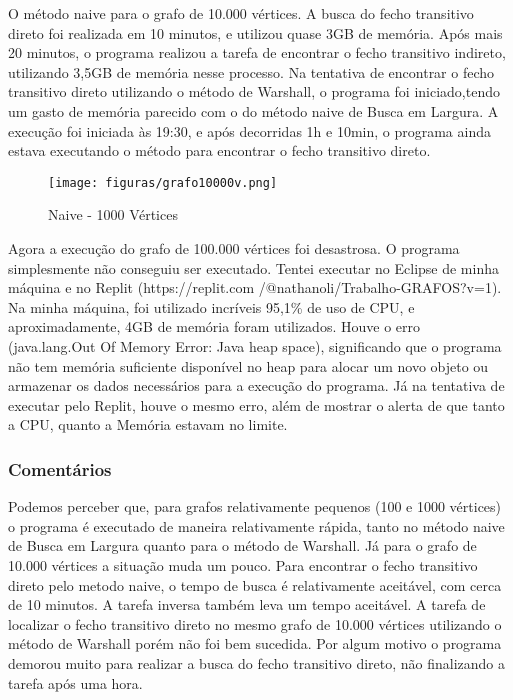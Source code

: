 \vspace{\baselineskip}

O método naive para o grafo de 10.000 vértices. A busca do fecho transitivo direto foi realizada em 10 minutos, e utilizou quase 3GB de memória. Após mais 20 minutos, o programa realizou a tarefa de encontrar o fecho transitivo indireto, utilizando 3,5GB de memória nesse processo. Na tentativa de encontrar o fecho transitivo direto utilizando o método de Warshall, o programa foi iniciado,tendo um gasto de memória parecido com o do método naive de Busca em Largura. A execução foi iniciada às 19:30, e após decorridas 1h e 10min, o programa ainda estava executando o método para encontrar o fecho transitivo direto. 

\begin{figure}[ht]
	\centering	
	\caption[\hspace{0.1cm}Eclipse Idle]{Naive - 1000 Vértices}
	\vspace{-0.4cm}
	\texttt{[image: figuras/grafo10000v.png]}
	 \vspace{-0.2cm}
\end{figure}
\vspace{-0.5cm}

\vspace{\baselineskip}

Agora a execução do grafo de 100.000 vértices foi desastrosa. O programa simplesmente não conseguiu ser executado. Tentei executar no Eclipse de minha máquina e no Replit (https://replit.com
/@nathanoli/Trabalho-GRAFOS?v=1). 
Na minha máquina, foi utilizado incríveis 95,1\% de uso de CPU, e aproximadamente, 4GB de memória foram utilizados. Houve o erro (java.lang.Out Of Memory Error: 
Java heap space), significando que o programa  não tem memória suficiente disponível no heap para alocar um novo objeto ou armazenar os dados necessários para a execução do programa. 
Já na tentativa de executar pelo Replit, houve o mesmo erro, além de mostrar o alerta de que tanto a CPU, quanto a Memória estavam no limite.

\subsubsection{\esp Comentários}

Podemos perceber que, para grafos relativamente pequenos (100 e 1000 vértices) o programa é executado de maneira relativamente rápida, tanto no método naive de Busca em Largura quanto para o método de Warshall. Já para o grafo de 10.000 vértices a situação muda um pouco. Para encontrar o fecho transitivo direto pelo metodo naive, o tempo de busca é relativamente aceitável, com cerca de 10 minutos. A tarefa inversa também leva um tempo aceitável. A tarefa de localizar o fecho transitivo direto no mesmo grafo de 10.000 vértices utilizando o método de Warshall porém não foi bem sucedida. Por algum motivo o programa demorou muito para realizar a busca do fecho transitivo direto, não finalizando a tarefa após uma hora. 

